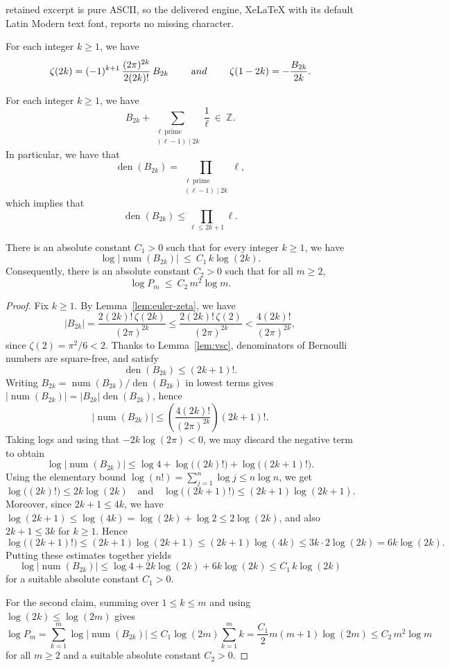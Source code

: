 \documentclass[10pt,a4paper]{amsart}
\DeclareMathOperator{\den}{den}
\DeclareMathOperator{\num}{num}
\newcommand{\ZZ}{\mathbb{Z}}
\begin{document}
retained excerpt is pure ASCII, so the delivered engine, XeLaTeX with its default Latin Modern text font, reports no missing character.
\begin{lemma}\label{lem:euler-zeta}
For each integer $k\ge 1$, we have
\[
\zeta(2k)=(-1)^{k+1}\,\frac{(2\pi)^{2k}}{2(2k)!}\,B_{2k} \ \qquad {\text and}\ \qquad
\zeta(1-2k)=-\frac{B_{2k}}{2k}.
\]
\end{lemma}

\begin{lemma}\label{lem:vsc}
For each integer $k\ge 1$, we have
\[
B_{2k}+\sum_{\substack{\ell\ \mathrm{prime}\\ (\ell-1)\mid 2k}}\frac{1}{\ell}\ \in\ \ZZ.
\]
In particular, we have that
\[
\den(B_{2k})=\prod_{\substack{\ell\ \mathrm{prime}\\ (\ell-1)\mid 2k}}\ell, \label{eqn:lean-mess}
\]
which implies that
\begin{equation}
\label{eqn:vsc_consequence}
    \den(B_{2k})\le \prod_{\ell\le 2k+1}\ell.
\end{equation}
\end{lemma}

\begin{lemma}\label{lem:num-growth}
There is an absolute constant $C_1>0$ such that for every integer $k\ge 1$, we have
\[
\log\bigl|\num(B_{2k})\bigr|\ \le\ C_1\,k\log(2k).
\]
Consequently, there is an absolute constant $C_2>0$ such that for all $m\ge 2$,
\[
\log P_m\ \le\ C_2\,m^2\log m.
\]
\end{lemma}

\begin{proof}
Fix $k\ge 1$.
By Lemma~\ref{lem:euler-zeta}, we have
\[
|B_{2k}|=\frac{2(2k)!\,\zeta(2k)}{(2\pi)^{2k}}
\le \frac{2(2k)!\,\zeta(2)}{(2\pi)^{2k}}
< \frac{4(2k)!}{(2\pi)^{2k}},
\]
since $\zeta(2)=\pi^2/6<2$.
Thanks to Lemma~\ref{lem:vsc}, denominators of Bernoulli numbers are square-free, and satisfy
\[
\den(B_{2k})\le (2k+1)!.
\]
Writing $B_{2k}=\num(B_{2k})/\den(B_{2k})$ in lowest terms gives
$|\num(B_{2k})|=|B_{2k}|\den(B_{2k})$, hence
\[
|\num(B_{2k})|
\le \left(\frac{4(2k)!}{(2\pi)^{2k}}\right) (2k+1)!.
\]
Taking logs and using that $-2k\log(2\pi)<0$, we may discard the negative term to obtain
\[
\log\bigl|\num(B_{2k})\bigr|
\le \log 4 + \log\bigl((2k)!\bigr) + \log\bigl((2k+1)!\bigr).
\]
Using the elementary bound $\log(n!)=\sum_{j=1}^n \log j \le n\log n$, we get
\[
\log\bigl((2k)!\bigr)\le 2k\log(2k)
\quad\text{and}\quad
\log\bigl((2k+1)!\bigr)\le (2k+1)\log(2k+1).
\]
Moreover, since $2k+1\le 4k$, we have $\log(2k+1)\le \log(4k)=\log(2k)+\log 2\le 2\log(2k)$,
and also $2k+1\le 3k$ for $k\ge 1$. Hence
\[
\log\bigl((2k+1)!\bigr)\le (2k+1)\log(2k+1)
\le (2k+1)\log(4k)
\le 3k\cdot 2\log(2k)=6k\log(2k).
\]
Putting these estimates together yields
\[
\log\bigl|\num(B_{2k})\bigr|
\le \log 4 + 2k\log(2k) + 6k\log(2k)
\le C_1\,k\log(2k)
\]
for a suitable absolute constant $C_1>0$.

For the second claim, summing over $1\le k\le m$ and using $\log(2k)\le \log(2m)$ gives
\[
\log P_m=\sum_{k=1}^m \log\bigl|\num(B_{2k})\bigr|
\le C_1 \log(2m)\sum_{k=1}^m k
= \frac{C_1}{2}m(m+1)\log(2m)
\le C_2\,m^2\log m
\]
for all $m\ge 2$ and a suitable absolute constant $C_2>0$.
\end{proof}
\end{document}
